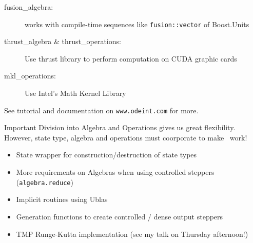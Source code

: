 \begin{frame}[fragile]

\begin{description}
 \item[fusion\_algebra:] works with compile-time sequences like \lstinline+fusion::vector+ of Boost.Units
 \item[thrust\_algebra \& thrust\_operations:] Use thrust library to perform computation on CUDA graphic cards
 \item[mkl\_operations:] Use Intel's Math Kernel Library
\end{description}

See tutorial and documentation on \verb+www.odeint.com+ for more.

\pause
\vspace{0.5em}
\begin{block}{Important}
 Division into Algebra and Operations gives us great flexibility. However, state type, algebra and operations must coorporate to make \odeint\ work!
\end{block}

\end{frame}

\begin{frame}

\vspace{2ex}
\begin{itemize}
 \item State wrapper for construction/destruction of state types
 \item More requirements on Algebras when using controlled steppers (\lstinline+algebra.reduce+)
 \item Implicit routines using Ublas
 \item Generation functions to create controlled / dense output steppers
 \item TMP Runge-Kutta implementation (see my talk on Thursday afternoon!)
\end{itemize}

\end{frame}

